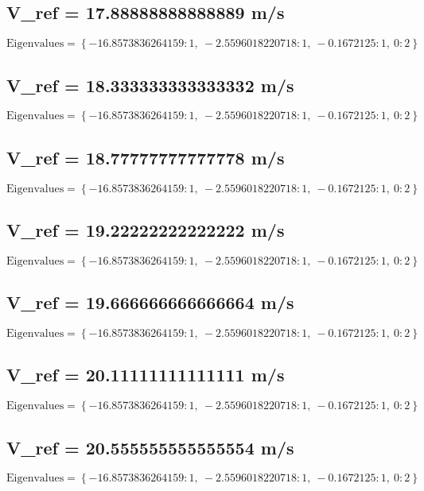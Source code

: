 \documentclass{article}
\begin{document}
\subsection*{V_ref = 17.88888888888889 m/s}
\begin{equation}
\text{Eigenvalues} = \left\{ -16.8573836264159 : 1, \  -2.5596018220718 : 1, \  -0.1672125 : 1, \  0 : 2\right\}
\end{equation}
\subsection*{V_ref = 18.333333333333332 m/s}
\begin{equation}
\text{Eigenvalues} = \left\{ -16.8573836264159 : 1, \  -2.5596018220718 : 1, \  -0.1672125 : 1, \  0 : 2\right\}
\end{equation}
\subsection*{V_ref = 18.77777777777778 m/s}
\begin{equation}
\text{Eigenvalues} = \left\{ -16.8573836264159 : 1, \  -2.5596018220718 : 1, \  -0.1672125 : 1, \  0 : 2\right\}
\end{equation}
\subsection*{V_ref = 19.22222222222222 m/s}
\begin{equation}
\text{Eigenvalues} = \left\{ -16.8573836264159 : 1, \  -2.5596018220718 : 1, \  -0.1672125 : 1, \  0 : 2\right\}
\end{equation}
\subsection*{V_ref = 19.666666666666664 m/s}
\begin{equation}
\text{Eigenvalues} = \left\{ -16.8573836264159 : 1, \  -2.5596018220718 : 1, \  -0.1672125 : 1, \  0 : 2\right\}
\end{equation}
\subsection*{V_ref = 20.11111111111111 m/s}
\begin{equation}
\text{Eigenvalues} = \left\{ -16.8573836264159 : 1, \  -2.5596018220718 : 1, \  -0.1672125 : 1, \  0 : 2\right\}
\end{equation}
\subsection*{V_ref = 20.555555555555554 m/s}
\begin{equation}
\text{Eigenvalues} = \left\{ -16.8573836264159 : 1, \  -2.5596018220718 : 1, \  -0.1672125 : 1, \  0 : 2\right\}
\end{equation}
\end{document}
